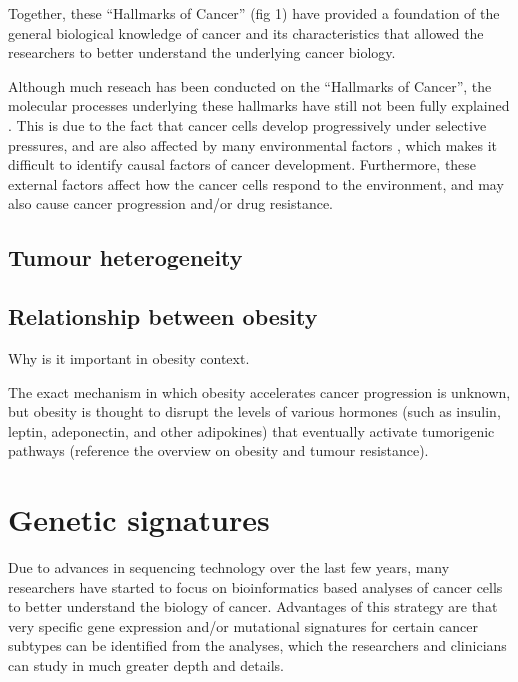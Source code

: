 Together, these ``Hallmarks of Cancer'' (fig 1) have provided a foundation of the general biological knowledge of cancer and its characteristics that allowed the researchers to better understand the underlying cancer biology.

Although much reseach has been conducted on the ``Hallmarks of Cancer'', the molecular processes underlying these hallmarks have still not been fully explained \citep{Hanahan2011}.
This is due to the fact that cancer cells develop progressively under selective pressures, and are also affected by many environmental factors \citep{Gatza2011}, which makes it difficult to identify causal factors of cancer development.
Furthermore, these external factors affect how the cancer cells respond to the environment, and may also cause cancer progression and/or drug resistance.

\subsection{Tumour heterogeneity}
\label{sub:tumour_heterogeneity}




\subsection{Relationship between obesity}
\label{subsec:obsbackground}

Why is it important in obesity context.

The exact mechanism in which obesity accelerates cancer progression is unknown, but obesity is thought to disrupt the levels of various hormones (such as insulin, leptin, adeponectin, and other adipokines) that eventually activate tumorigenic pathways (reference the overview on obesity and tumour resistance).

\section{Genetic signatures}
\label{sec:genetic_signatures}

Due to advances in sequencing technology over the last few years, many researchers have started to focus on bioinformatics based analyses of cancer cells to better understand the biology of cancer.
Advantages of this strategy are that very specific gene expression and/or mutational signatures for certain cancer subtypes can be identified from the analyses, which the researchers and clinicians can study in much greater depth and details.

